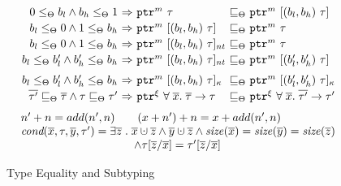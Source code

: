 \begin{DIFnomarkup}
\begin{figure}
{\[\begin{array}{l}
\begin{array}{r@{~}c@{~}l@{~}c@{~}l}
    0\le_{\Theta} b_l \wedge b_h \le_{\Theta} 1 &\Rightarrow& \tptr{\tau}{m}&\sqsubseteq_{\Theta}& \tarrayptr{b_l}{b_h}{\tau}{m}\\[0.2em]
    b_l \le_{\Theta} 0 \wedge 1 \le_{\Theta} b_h &\Rightarrow& \tarrayptr{b_l}{b_h}{\tau}{m} &\sqsubseteq_{\Theta}& \tptr{\tau}{m}\\[0.2em]
    b_l \le_{\Theta} 0 \wedge 1 \le_{\Theta} b_h &\Rightarrow& \tntarrayptr{b_l}{b_h}{\tau}{m} &\sqsubseteq_{\Theta}& \tptr{\tau}{m}\\[0.2em]
    b_l \le_{\Theta} b_l' \wedge b_h' \le_{\Theta} b_h &\Rightarrow& \tntarrayptr{b_l}{b_h}{\tau}{m} &\sqsubseteq_{\Theta}& \tarrayptr{b_l'}{b_h'}{\tau}{m}\\[0.6em]
    b_l \le_{\Theta} b_l' \wedge b_h' \le_{\Theta} b_h &\Rightarrow& \tallarrayptr{b_l}{b_h}{\tau}{m} &\sqsubseteq_{\Theta}& \tallarrayptr{b_l'}{b_h'}{\tau}{m}
\\[0.2em]
\overline{\tau'}\sqsubseteq_{\Theta}\overline{\tau}\wedge \tau\sqsubseteq_{\Theta}\tau' &\Rightarrow& \tptr{\tfun{\overline{x}}{\overline{\tau}}{\tau}}{\xi} &\sqsubseteq_{\Theta}& \tptr{\tfun{\overline{x}}{\overline{\tau'}}{\tau'}}{\xi}

    \end{array}
\end{array}
  \]
}
{\footnotesize
\[
\begin{array}{l}
n'+n = add(n',n)
\qquad
(x+n')+n = x+add(n',n)\\
\textit{cond}(\overline{x},\tau,\overline{y},\tau')
=\exists\overline{z}\;.\;\overline{x}\cupdot\overline{z}
  \wedge \overline{y}\cupdot\overline{z}
  \wedge \size(\overline{x})=\size(\overline{y})=\size(\overline{z})
\\\qquad\qquad\qquad\qquad\qquad
  \wedge \tau[\overline{z}/\overline{x}]= \tau'[\overline{z}/\overline{x}]
\end{array}
\]
}
  \caption{Type Equality and Subtyping}
  \label{fig:checkc-subtype}
\end{figure}
\end{DIFnomarkup}

